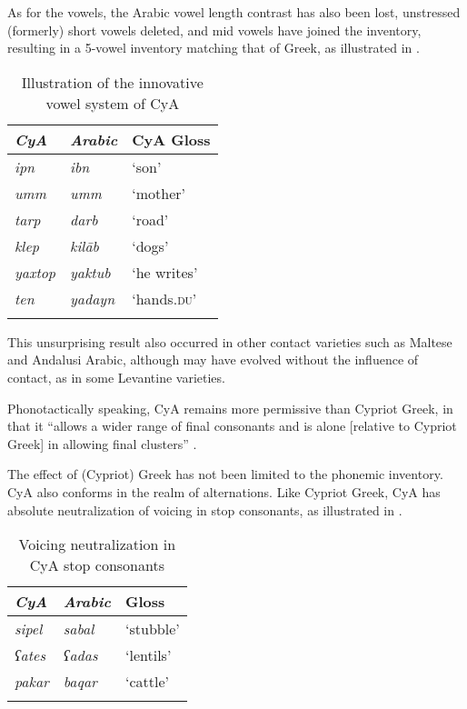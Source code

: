 \documentclass[output=paper]{langsci/langscibook}
\begin{document}
As for the vowels, the Arabic vowel length contrast has also been lost, unstressed (formerly) short vowels deleted, and mid vowels have joined the inventory, resulting in a 5-vowel inventory matching that of Greek, as illustrated in .

\begin{table}
\begin{tabular}{>{\itshape}l>{\itshape}ll}
\lsptoprule
{\normalfont CyA} & {\normalfont Arabic} & {CyA Gloss}\\\midrule
ipn & ibn & ‘son’\\
umm & umm & ‘mother’\\
tarp & darb & ‘road’\\
klep & kilāb & ‘dogs’\\
yaxtop & yaktub & ‘he writes’\\
ten & yadayn & ‘hands\textsc{.du}’\\
\lspbottomrule
\end{tabular}
\caption{\label{bkm:Ref13775635}Illustration of the innovative vowel system of CyA\label{tab:walter:2}}
\end{table}

This unsurprising result also occurred in other contact varieties such as Maltese and Andalusi Arabic, although may have evolved without the influence of contact, as in some Levantine varieties. 

Phonotactically speaking, CyA remains more permissive than Cypriot Greek, in that it “allows a wider range of final consonants and is alone [relative to Cypriot Greek] in allowing final clusters” \citep[51]{Newton1964}.

The effect of (Cypriot) Greek has not been limited to the phonemic inventory. CyA also conforms in the realm of alternations. Like Cypriot Greek, CyA has absolute neutralization of voicing in stop consonants, as illustrated in .

\begin{table}
\begin{tabular}{>{\itshape}l>{\itshape}ll}
\lsptoprule
{\normalfont CyA} & {\normalfont Arabic} & {Gloss}\\\midrule
sipel & sabal & ‘stubble’\\
{}ʕates & ʕadas & ‘lentils’\\
pakar & baqar & ‘cattle’\\
\lspbottomrule
\end{tabular}
\caption{\label{bkm:Ref13775945}Voicing neutralization in CyA stop consonants\label{tab:walter:3}}
\end{table}
\end{document}
